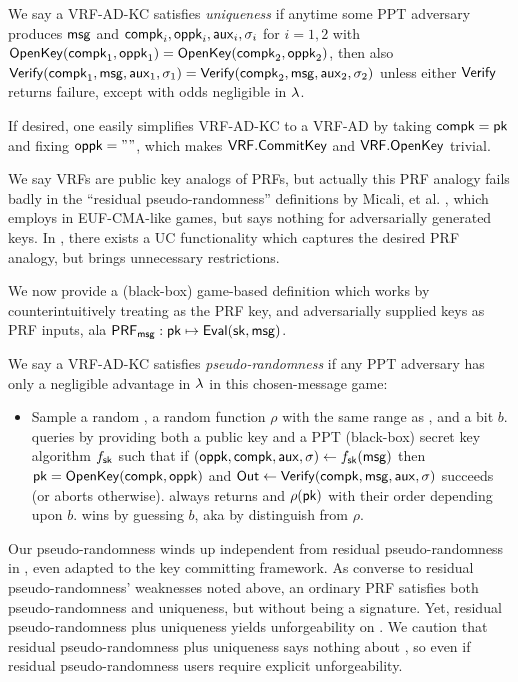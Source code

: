 \begin{definition}
We say a VRF-AD-KC satisfies {\em uniqueness} if anytime some PPT adversary \adv
produces $\mathsf{msg}$ and $\mathsf{compk}_i,\mathsf{oppk}_i,\mathsf{aux}_i,\sigma_i$ for $i=1,2$
 with ${\mathsf{OpenKey}}(\mathsf{compk}_1,\mathsf{oppk}_1) = {\mathsf{OpenKey}}(\mathsf{compk}_2,\mathsf{oppk}_2)$, then also
${\mathsf{Verify}}(\mathsf{compk}_1,\mathsf{msg},\mathsf{aux}_1,\sigma_1) = {\mathsf{Verify}}(\mathsf{compk}_2,\mathsf{msg},\mathsf{aux}_2,\sigma_2)$
unless either ${\mathsf{Verify}}$ returns failure,
except with odds negligible in $\lambda$.
\end{definition}

If desired, one easily simplifies VRF-AD-KC to a VRF-AD by
 taking $\mathsf{compk} = \mathsf{pk}$ and fixing $\mathsf{oppk} = \mathtt{""}$,
 which makes ${\mathsf{VRF}}.{\mathsf{CommitKey}}$ and ${\mathsf{VRF}}.{\mathsf{OpenKey}}$ trivial.

\smallskip

We say VRFs are public key analogs of PRFs, but actually this PRF analogy
fails badly in the ``residual pseudo-randomness'' definitions by
Micali, et al. \cite{vrf_micali}, which employs  in EUF-CMA-like
games, but says nothing for adversarially generated keys.
%
In \cite{praos}, there exists a UC functionality which captures the
desired PRF analogy, but brings unnecessary restrictions.

We now provide a (black-box) game-based definition which works by
counterintuitively treating \msg as the PRF key, and adversarially
supplied keys as PRF inputs, ala ${\mathsf{PRF}}_\mathsf{msg} : \mathsf{pk} \mapsto {\ensuremath{\mathsf{Eval}}}(\mathsf{sk},\mathsf{msg})$.

\begin{definition}
We say a VRF-AD-KC satisfies {\em pseudo-randomness} if 
any PPT adversary \adv has only a negligible advantage in $\lambda$
in this chosen-message game:
\begin{itemize}
\item[]
 Sample a random \msg, a random function $\rho$ with the same range as \Eval, and a bit $b$.
 \adv queries  by providing both a public key \pk and
 a PPT (black-box) secret key algorithm $f_\mathsf{sk}$ such that
 if $(\mathsf{oppk},\mathsf{compk},\mathsf{aux},\sigma) \leftarrow f_\mathsf{sk}(\mathsf{msg})$ then
 $\mathsf{pk} = {\mathsf{OpenKey}}(\mathsf{compk},\mathsf{oppk})$ and
 ${\mathsf{Out}} \leftarrow {\ensuremath{\mathsf{Verify}}}(\mathsf{compk},\mathsf{msg},\mathsf{aux},\sigma)$ succeeds (or aborts otherwise).
  always returns \Out and $\rho(\mathsf{pk})$ with their order depending upon $b$.
 \adv wins by guessing $b$, aka by distinguish \Verify from $\rho$.
\end{itemize}
\end{definition}

Our pseudo-randomness winds up independent from residual pseudo-randomness
in \cite{vrf_micali}, even adapted to the key committing framework.
As converse to residual pseudo-randomness' weaknesses noted above,
an ordinary PRF satisfies both pseudo-randomness and uniqueness, but
without being a signature.  Yet, residual pseudo-randomness plus
uniqueness yields unforgeability on \msg.  We caution that
residual pseudo-randomness plus uniqueness says nothing about \aux, so
even if residual pseudo-randomness users require explicit unforgeability.

